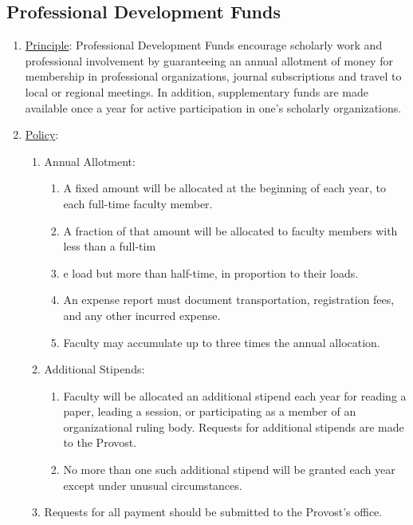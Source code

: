 	\subsection{Professional Development Funds}
		\begin{enumerate}[label=\alph*)]
			\item{\underline{Principle}:  Professional Development Funds encourage scholarly work and professional involvement by guaranteeing an annual allotment of money for membership in professional organizations, journal subscriptions and travel to local or regional meetings.  In addition, supplementary funds are made available once a year for active participation in one's scholarly organizations.
			}
			\item{\underline{Policy}:
				\begin{enumerate}[label=\arabic*)]
					\item{Annual Allotment:
						\begin{enumerate}[label=(\alph*)]
							\item{A fixed amount will be allocated at the beginning of each year, to each full-time faculty member.
							}
							\item{A fraction of that amount will be allocated to faculty members with less than a full-tim
							}
							\item{e load but more than half-time, in proportion to their loads.
							}
							\item{An expense report must document transportation, registration fees, and any other incurred expense.
							}
							\item{Faculty may accumulate up to three times the annual allocation.
							}
						\end{enumerate}
					}
					\item{Additional Stipends:
						\begin{enumerate}[label=(\alph*)]
							\item{Faculty will be allocated an additional stipend each year for reading a paper, leading a session, or participating as a member of an organizational ruling body.  Requests for additional stipends are made to the Provost.
							}
							\item{No more than one such additional stipend will be granted each year except under unusual circumstances.
							}
						\end{enumerate}
					}
					\item{Requests for all payment should be submitted to the Provost's office.
					}
				\end{enumerate}
			}
		\end{enumerate}
